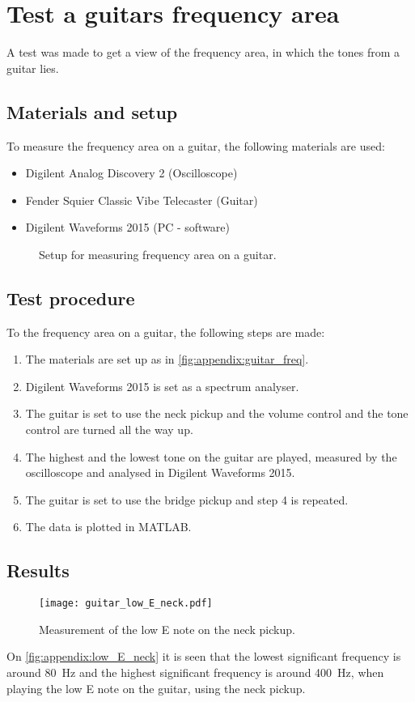\chapter{Test a guitars frequency area}\label{app:frequency_area}
A test was made to get a view of the frequency area, in which the tones from a guitar lies.

\section*{Materials and setup}
To measure the frequency area on a guitar, the following materials are used:
\begin{itemize}
\item Digilent Analog Discovery 2 (Oscilloscope)
\item Fender Squier Classic Vibe Telecaster (Guitar)
\item Digilent Waveforms 2015 (PC - software)
\end{itemize}

\begin{figure}[htbp!]
\centering
\def\svgwidth{\columnwidth}

\caption{Setup for measuring frequency area on a guitar.}
		\label{fig:appendix:guitar_freq}
\end{figure}

\section*{Test procedure}
To the frequency area on a guitar, the following steps are made:
\begin{enumerate}
\item The materials are set up as in \autoref{fig:appendix:guitar_freq}.
\item Digilent Waveforms 2015 is set as a spectrum analyser. 
\item The guitar is set to use the neck pickup and the volume control and the tone control are turned all the way up.
\item The highest and the lowest tone on the guitar are played, measured by the oscilloscope and analysed in Digilent Waveforms 2015.
\item The guitar is set to use the bridge pickup and step 4 is repeated. 
\item The data is plotted in MATLAB.
\end{enumerate}

\section*{Results}

\begin{figure}[htbp!]
	\centering
		\texttt{[image: guitar\_low\_E\_neck.pdf]}
		\caption{Measurement of the low E note on the neck pickup.}
		\label{fig:appendix:low_E_neck}
\end{figure}

On  \autoref{fig:appendix:low_E_neck} it is seen that the lowest significant frequency is around \SI{80}{\hertz} and the highest significant frequency is around \SI{400}{\hertz}, when playing the low E note on the guitar, using the neck pickup.
